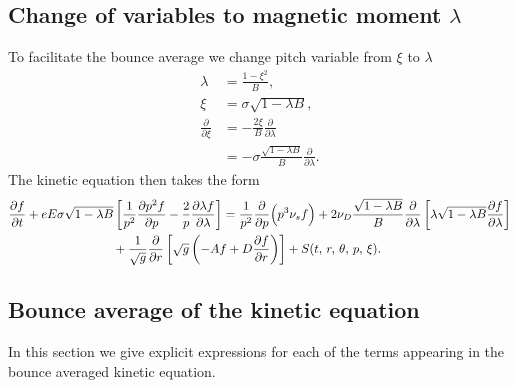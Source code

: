 \documentclass[11pt,a4paper]{article}
\begin{document}
\subsection{Change of variables to magnetic moment $\lambda$}
To facilitate the bounce average we change pitch variable from $\xi$ to $\lambda$
\begin{align}
\lambda &= \frac{1-\xi^2}{B}, \nonumber \\
\xi &= \sigma\sqrt{1-\lambda B}, \nonumber \\
\frac{\partial}{\partial \xi} &= -\frac{2\xi}{B}\frac{\partial}{\partial \lambda} \nonumber \\
&= -\sigma\frac{\sqrt{1-\lambda B}}{B}\frac{\partial}{\partial \lambda} .
\end{align}
The kinetic equation then takes the form
\begin{align}
\frac{\partial f}{\partial t} + eE \sigma\sqrt{1-\lambda B}\left[\frac{1}{p^2}\frac{\partial p^2 f}{\partial p}  - \frac{2}{p}\frac{\partial \lambda f}{\partial \lambda}\right] &= \frac{1}{p^2}\frac{\partial}{\partial p}\Big(p^3 \nu_s  f\Big) + 2\nu_D\frac{\sqrt{1-\lambda B}}{B}\frac{\partial}{\partial \lambda}\left[\lambda \sqrt{1-\lambda B}\frac{\partial f}{\partial \lambda}\right] \nonumber \\
&\hspace{-31mm} + \frac{1}{\sqrt{g}}\frac{\partial}{\partial r}\left[ \sqrt{g}\left( -Af+D\frac{\partial f}{\partial r}\right)\right] + S(t,\,r,\,\theta,\,p,\,\xi).
\end{align}
 
\subsection{Bounce average of the kinetic equation}
In this section we give explicit expressions for each of the terms appearing in the bounce averaged kinetic equation.
\end{document}
